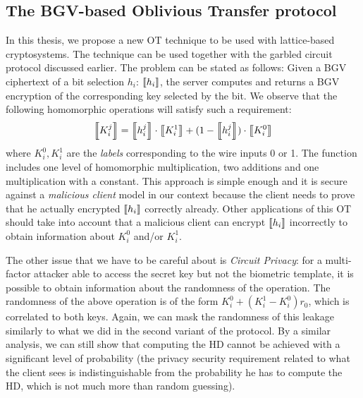 \subsection{The BGV-based Oblivious Transfer protocol}
\label{sec:finalContr2}
In this thesis, we propose a new OT
technique to be used with lattice-based cryptosystems. The technique can be used
together with the garbled circuit protocol discussed earlier. The problem can be
stated as follows: Given a BGV ciphertext of a bit selection \(h_{i}\):
\(\left\llbracket h_{i}\right\rrbracket\), the server computes and returns a BGV encryption of the
corresponding key selected by the bit. We observe that the following homomorphic
operations will satisfy such a requirement:
\[
\left\llbracket K_{i}^{j}\right\rrbracket = \left\llbracket h_{i}^{j}\right\rrbracket \cdot \left\llbracket K_{i}^{1}\right\rrbracket + (1 - \left\llbracket h_{i}^{j}\right\rrbracket) \cdot \left\llbracket K_{i}^{0}\right\rrbracket
\]
where \(K_{i}^{0}, K_{i}^{1}\) are the \textit{labels} corresponding to the wire
inputs 0 or 1. The function includes one level of homomorphic multiplication, two
additions and one multiplication with a constant. This approach is simple enough
and it is secure against a \textit{malicious client} model in our context because
the client needs to prove that he actually encrypted \(\left\llbracket h_{i}\right\rrbracket\)
correctly already. Other applications of this OT should take into account that a
malicious client can encrypt \(\left\llbracket h_{i}\right\rrbracket\) incorrectly to obtain information about
\(K_{i}^{0}\) and/or \(K_{i}^{1}\).

The other issue that we have to be careful about is \textit{Circuit Privacy}:
for a multi-factor attacker able to access the secret key but not the
biometric template, it is possible to obtain information about the randomness of the
operation. The randomness of the above operation is of the form
\(K_{i}^{0} + (K_{i}^{1} - K_{i}^{0})r_{0}\), which is correlated to both
keys. Again, we can mask the randomness of this leakage similarly to what we did
in the second variant of the protocol. By a similar analysis, we can still show
that computing the HD cannot be achieved with a significant level of probability (the privacy
security requirement related to what the client sees is indistinguishable
from the probability he has to compute the HD, which is not much more than random
guessing).

